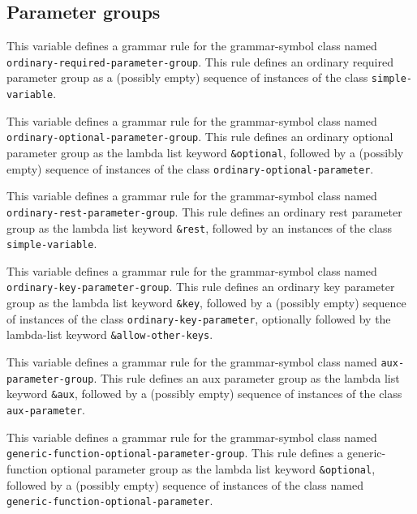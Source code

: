 \subsection{Parameter groups}


This variable defines a grammar rule for the grammar-symbol class
named \texttt{ordinary-required-parameter-group}.  This rule defines
an ordinary required parameter group as a (possibly empty) sequence of
instances of the class \texttt{simple-variable}.


This variable defines a grammar rule for the grammar-symbol class
named \texttt{ordinary-optional-parameter-group}.  This rule defines
an ordinary optional parameter group as the lambda list keyword
\texttt{\&optional}, followed by a (possibly empty) sequence of
instances of the class \texttt{ordinary-optional-parameter}.


This variable defines a grammar rule for the grammar-symbol class
named \texttt{ordinary-rest-parameter-group}.  This rule defines an
ordinary rest parameter group as the lambda list keyword
\texttt{\&rest}, followed by an instances of the class
\texttt{simple-variable}.


This variable defines a grammar rule for the grammar-symbol class
named \texttt{ordinary-key-parameter-group}.  This rule defines
an ordinary key parameter group as the lambda list keyword
\texttt{\&key}, followed by a (possibly empty) sequence of
instances of the class \texttt{ordinary-key-parameter}, optionally
followed by the lambda-list keyword \texttt{\&allow-other-keys}.


This variable defines a grammar rule for the grammar-symbol class
named \texttt{aux-parameter-group}.  This rule defines an aux
parameter group as the lambda list keyword \texttt{\&aux}, followed by
a (possibly empty) sequence of instances of the class
\texttt{aux-parameter}.


This variable defines a grammar rule for the grammar-symbol class
named \texttt{generic-function-optional-parameter-group}.  This rule
defines a generic-function optional parameter group as the lambda list
keyword \texttt{\&optional}, followed by a (possibly empty) sequence
of instances of the class named\\
\texttt{generic-function-optional-parameter}.

